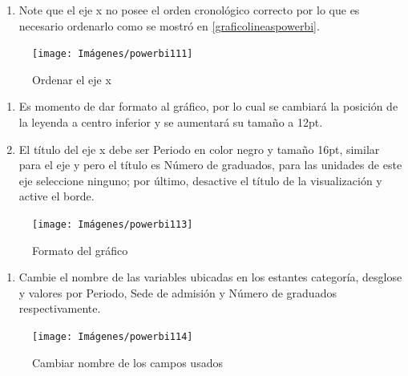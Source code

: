 \documentclass[
]{book}
\providecommand{\tightlist}{%
  \setlength{\itemsep}{0pt}\setlength{\parskip}{0pt}}
\begin{document}
\begin{enumerate}
\def\labelenumi{\arabic{enumi}.}
\setcounter{enumi}{3}
\tightlist
\item
  Note que el eje x no posee el orden cronológico correcto por lo que es necesario ordenarlo como se mostró en \ref{graficolineaspowerbi}.
\end{enumerate}

\begin{figure}

{\centering \texttt{[image: Imágenes/powerbi111]} 

}

\caption{Ordenar el eje x}\label{fig:paso4cascada-fig}
\end{figure}

\begin{enumerate}
\def\labelenumi{\arabic{enumi}.}
\setcounter{enumi}{4}
\item
  Es momento de dar formato al gráfico, por lo cual se cambiará la posición de la leyenda a centro inferior y se aumentará su tamaño a 12pt.
\item
  El título del eje x debe ser Periodo en color negro y tamaño 16pt, similar para el eje y pero el título es Número de graduados, para las unidades de este eje seleccione ninguno; por último, desactive el título de la visualización y active el borde.
\end{enumerate}

\begin{figure}

{\centering \texttt{[image: Imágenes/powerbi113]} 

}

\caption{Formato del gráfico}\label{fig:paso6cascada-fig}
\end{figure}

\begin{enumerate}
\def\labelenumi{\arabic{enumi}.}
\setcounter{enumi}{6}
\tightlist
\item
  Cambie el nombre de las variables ubicadas en los estantes categoría, desglose y valores por Periodo, Sede de admisión y Número de graduados respectivamente.
\end{enumerate}

\begin{figure}

{\centering \texttt{[image: Imágenes/powerbi114]} 

}

\caption{Cambiar nombre de los campos usados}\label{fig:paso7cascada-fig}
\end{figure}
\end{document}

